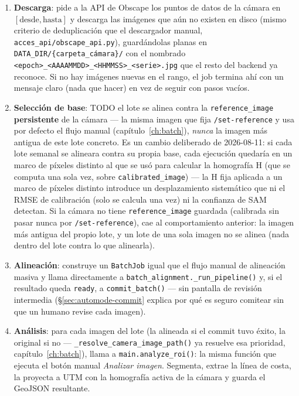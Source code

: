 \begin{enumerate}[leftmargin=1.5em]
  \item \textbf{Descarga}: pide a la API de Obscape los puntos de datos de la cámara en
        \([\text{desde}, \text{hasta}]\) y descarga las imágenes que aún no existen en disco
        (mismo criterio de deduplicación que el descargador manual,
        \texttt{acces\_api/obscape\_api.py}), guardándolas planas en
        \texttt{DATA\_DIR/\{carpeta\_cámara\}/} con el nombrado
        \texttt{<epoch>\_\allowbreak<AAAAMMDD>\_\allowbreak<HHMMSS>\_\allowbreak<serie>.jpg}
        que el resto del backend ya
        reconoce. Si no hay imágenes nuevas en el rango, el job termina ahí con un mensaje
        claro (nada que hacer) en vez de seguir con pasos vacíos.
  \item \textbf{Selección de base}: TODO el lote se alinea contra la \texttt{reference\_image}
        \textbf{persistente} de la cámara — la misma imagen que fija \texttt{/set-reference} y
        usa por defecto el flujo manual (capítulo~\ref{ch:batch}), \emph{nunca} la imagen más
        antigua de este lote concreto. Es un cambio deliberado de 2026-08-11: si cada lote
        semanal se alineara contra su propia base, cada ejecución quedaría en un marco de
        píxeles distinto al que se usó para calcular la homografía H (que se computa una sola
        vez, sobre \texttt{calibrated\_image}) — la H fija aplicada a un marco de píxeles
        distinto introduce un desplazamiento sistemático que ni el RMSE de calibración (solo se
        calcula una vez) ni la confianza de SAM detectan. Si la cámara no tiene
        \texttt{reference\_image} guardada (calibrada sin pasar nunca por
        \texttt{/set-reference}), cae al comportamiento anterior: la imagen más antigua del
        propio lote, y un lote de una sola imagen no se alinea (nada dentro del lote contra lo
        que alinearla).
  \item \textbf{Alineación}: construye un \texttt{BatchJob} igual que el flujo manual de
        alineación masiva y llama directamente a \texttt{batch\_alignment.\_run\_pipeline()} y,
        si el resultado queda \texttt{ready}, a \texttt{commit\_batch()} — sin pantalla de
        revisión intermedia (\S\ref{sec:automode-commit} explica por qué es seguro comitear sin
        que un humano revise cada imagen).
  \item \textbf{Análisis}: para cada imagen del lote (la alineada si el commit tuvo éxito, la
        original si no — \texttt{\_resolve\_camera\_image\_path()} ya resuelve esa prioridad,
        capítulo~\ref{ch:batch}), llama a \texttt{main.analyze\_roi()}: la misma función que
        ejecuta el botón manual \emph{Analizar imagen}. Segmenta, extrae la línea de costa, la
        proyecta a UTM con la homografía activa de la cámara y guarda el GeoJSON resultante.
\end{enumerate}

